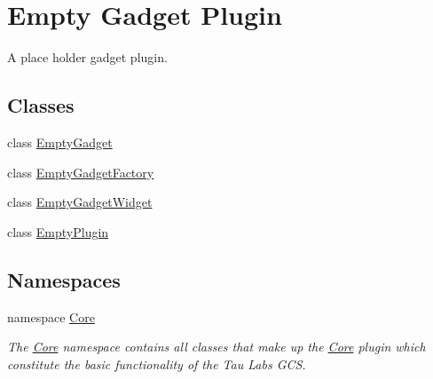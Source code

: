 \hypertarget{group___empty_gadget_plugin}{\section{\-Empty \-Gadget \-Plugin}
\label{group___empty_gadget_plugin}
}


\-A place holder gadget plugin.  


\subsection*{\-Classes}
\begin{DoxyCompactItemize}
\item 
class \hyperlink{class_empty_gadget}{\-Empty\-Gadget}
\item 
class \hyperlink{class_empty_gadget_factory}{\-Empty\-Gadget\-Factory}
\item 
class \hyperlink{class_empty_gadget_widget}{\-Empty\-Gadget\-Widget}
\item 
class \hyperlink{class_empty_plugin}{\-Empty\-Plugin}
\end{DoxyCompactItemize}
\subsection*{\-Namespaces}
\begin{DoxyCompactItemize}
\item 
namespace \hyperlink{namespace_core}{\-Core}
\begin{DoxyCompactList}\small\item\em \-The \hyperlink{namespace_core}{\-Core} namespace contains all classes that make up the \hyperlink{namespace_core}{\-Core} plugin which constitute the basic functionality of the \-Tau \-Labs \-G\-C\-S. \end{DoxyCompactList}\end{DoxyCompactItemize}

